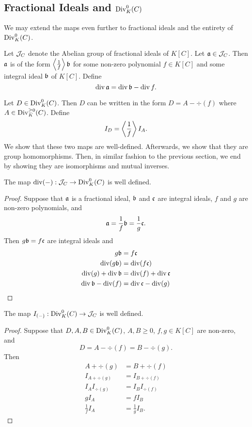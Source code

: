 
\subsection{Fractional Ideals and $\Div_K^0(C)$}

We may extend the maps even further to fractional ideals and the entirety of $\Div_K^0(C)$.

Let $\cal J_C$ denote the Abelian group of fractional ideals of $K[C]$.
Let $\frak a \in \cal J_C$.
Then $\frak a$ is of the form $\pid{\frac 1 f} \frak b$ for some non-zero polynomial $f \in K[C]$ and some integral ideal $\frak b$ of $K[C]$.
Define
\[ \div \frak a = \div \frak b - \div f. \]

Let $D \in \Div_K^0(C)$.
Then $D$ can be written in the form $D = A - \div(f)$ where $A \in \Div_K^{\geq 0}(C)$.
Define
\[ I_D = \pid{\frac 1 f} I_A. \]
We show that these two maps are well-defined.
Afterwards, we show that they are group homomorphisms.
Then, in similar fashion to the previous section, we end by showing they are isomorphisms and mutual inverses.

\begin{proposition}
  The map $\div(-) : \cal J_C \to \Div_K^0(C)$ is well defined.
\end{proposition}
\begin{proof}
  Suppose that $\frak a$ is a fractional ideal,
  $\frak b$ and $\frak c$ are integral ideals,
  $f$ and $g$ are non-zero polynomials, and
    \[ \frak a = \frac 1 f \frak b = \frac 1 g \frak c. \]
  Then $g \frak b = f \frak c$ are integral ideals and
  \begin{align*}
    g \frak b &= f \frak c \\
    \div(g \frak b) &= \div(f \frak c) \\
    \div(g) + \div \frak b &= \div(f) + \div \frak c \\
    \div \frak b - \div(f) &= \div \frak c - \div(g)
  \end{align*}
\end{proof}

\begin{proposition}
  The map $I_{(-)} : \Div_K^0(C) \to \cal J_C$ is well defined.
\end{proposition}
\begin{proof}
  Suppose that $D, A, B \in \Div_K^0(C)$, $A, B \geq 0$,
  $f, g \in K[C]$ are non-zero, and
    \[ D = A - \div(f) = B - \div(g). \]
  Then
  \begin{align*}
    A + \div(g) &= B + \div(f) \\
    I_{A + \div(g)} &= I_{B + \div(f)} \\
    I_A I_{\div(g)} &= I_B I_{\div(f)} \\
    g I_A &= f I_B \\
    \frac 1 f I_A &= \frac 1 g I_B.
  \end{align*}
\end{proof}

